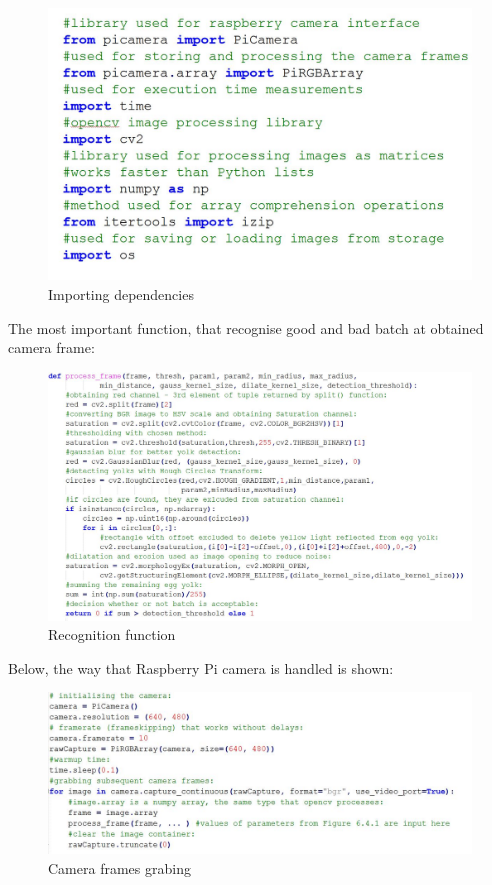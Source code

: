 \documentclass[12pt,twoside,a4paper]{article}
\begin{document}
\begin{figure}[H]
\centering
\includegraphics[width=0.5\paperwidth]{libs}
\caption{Importing dependencies}\label{fig:libs}
\end{figure}
\newpage
The most important function, that recognise good and bad batch at obtained camera frame:

\begin{figure}[H]
\centering
\includegraphics[width=0.8\paperwidth]{curcial}
\caption{Recognition function}\label{fig:crucial}
\end{figure}

Below, the way that Raspberry Pi camera is handled is shown:

\begin{figure}[H]
\centering
\includegraphics[width=0.8\paperwidth]{rpicode}
\caption{Camera frames grabing}\label{fig:rpicode}
\end{figure}
\end{document}
